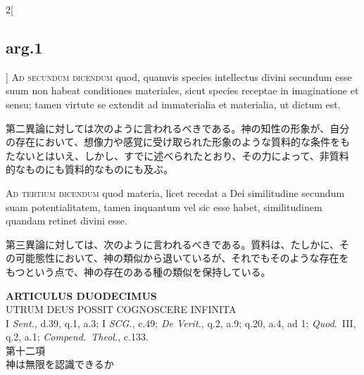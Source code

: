 \documentclass[paper=a4paper,fontsize=10pt,jafontsize=9pt,titlepage]{jlreq}
\begin{document}
\begin{paracol}{2}[\subsection{arg.1}]
{\scshape Ad secundum dicendum} quod, quamvis species intellectus
divini secundum esse suum non habeat conditiones materiales, sicut
species receptae in imaginatione et sensu; tamen virtute se extendit
ad immaterialia et materialia, ut dictum est.

\switchcolumn

第二異論に対しては次のように言われるべきである。神の知性の形象が、自分
の存在において、想像力や感覚に受け取られた形象のような質料的な条件をも
たないとはいえ、しかし、すでに述べられたとおり、その力によって、非質料
的なものにも質料的なものにも及ぶ。

\switchcolumn*[\subsection{ad.3}]

{\scshape Ad tertium dicendum} quod materia, licet recedat a Dei
similitudine secundum suam potentialitatem, tamen inquantum vel sic
esse habet, similitudinem quandam retinet divini esse.

\switchcolumn

第三異論に対しては、次のように言われるべきである。質料は、たしかに、そ
の可能態性において、神の類似から退いているが、それでもそのような存在を
もつという点で、神の存在のある種の類似を保持している。

\end{paracol}


\newpage


{}
\setcounter{section}{12}
\setcounter{subsection}{0}
\begin{center}
{\Large {\bfseries ARTICULUS DUODECIMUS}}\\ {\large UTRUM DEUS POSSIT
COGNOSCERE INFINITA}\\ {\footnotesize I {\itshape Sent.}, d.39, q.1,
a.3; I {\itshape SCG.}, c.49; {\itshape De Verit.}, q.2, a.9;
q.20, a.4, ad 1; {\itshape Quod}.~III, q.2, a.1; {\itshape
Compend.~Theol.}, c.133.}\\ {\Large 第十二項\\神は無限を認識できるか}
\end{center}
\end{document}
